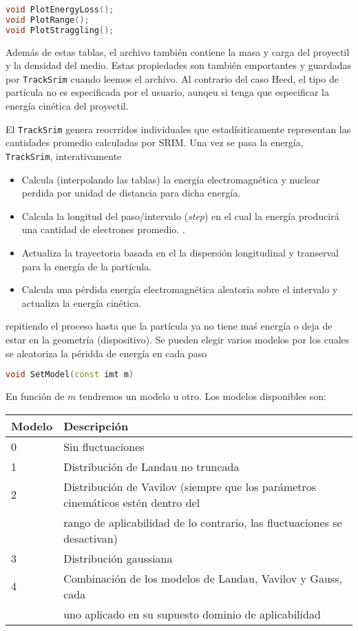 \begin{lstlisting}[language=C++,style=c++]
void PlotEnergyLoss();
void PlotRange();
void PlotStraggling(); 
\end{lstlisting}
\vspace*{0.6em}

Además de estas tablas, el archivo también contiene la masa y carga del proyectil y la densidad del medio. Estas propiedades son también emportantes y guardadas por \texttt{TrackSrim} cuando leemos el archivo. Al contrario del caso Heed, el tipo de partícula no es especificada por el usuario, aunqeu si tenga que especificar la energía cinética del proyectil.

El \texttt{TrackSrim} genera reocrridos individuales que estadísiticamente representan las cantidades promedio calculadas por SRIM. Una vez se pasa la energía, \texttt{TrackSrim}, interativamente

\begin{itemize}
    \item Calcula (interpolando las tablas) la energía electromagnética y nuclear perdida por unidad de distancia para dicha energía.
    \item Calcula la longitud del paso/intervalo (\textit{step}) en el cual la energía producirá una cantidad de electrones promedio. .
    \item Actualiza la trayectoria basada en el la dispersión longitudinal y transerval para la energía de la partícula. 
    \item Calcula una pérdida energía electromagnética aleatoria sobre el intervalo y actualiza la energía cinética.
\end{itemize}
repitiendo el proceso hasta que la partícula ya no tiene maś energía o deja de estar en la geometría (dispositivo). Se pueden elegir varios modelos por los cuales se aleatoriza la péridda de energía en cada paso

\begin{lstlisting}[language=C++,style=c++]
void SetModel(const imt m) 
\end{lstlisting}
\vspace*{0.6em}
En función de $m$ tendremos un modelo u otro. Los modelos disponibles son: 

\begin{table}[h!]
\centering
\begin{tabular}{ll}
\toprule
\textbf{Modelo} & \textbf{Descripción} \\
\midrule
0 & Sin fluctuaciones \\
1 & Distribución de Landau no truncada \\
2 & Distribución de Vavilov (siempre que los parámetros cinemáticos estén dentro del \\ & rango de aplicabilidad de lo contrario, las fluctuaciones se desactivan) \\
3 & Distribución gaussiana \\
4 & Combinación de los modelos de Landau, Vavilov y Gauss, cada \\
  &  uno aplicado en su supuesto dominio de aplicabilidad \\
\bottomrule
\end{tabular}
\end{table}

